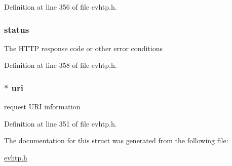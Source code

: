 Definition at line 356 of file evhtp.h.

\hypertarget{structevhtp__request__s_a9342eb644f9122b975cf9e2aed3cc00c}{
\subsubsection[{status}]{ {\bf status}}}
\label{structevhtp__request__s_a9342eb644f9122b975cf9e2aed3cc00c}
The HTTP response code or other error conditions 

Definition at line 358 of file evhtp.h.

\hypertarget{structevhtp__request__s_adfdac9f1ecf15761c62699a52d855a49}{
\subsubsection[{uri}]{$\ast$ {\bf uri}}}
\label{structevhtp__request__s_adfdac9f1ecf15761c62699a52d855a49}
request URI information 

Definition at line 351 of file evhtp.h.



The documentation for this struct was generated from the following file:\begin{DoxyCompactItemize}
\item 
\hyperlink{evhtp_8h}{evhtp.h}\end{DoxyCompactItemize}
